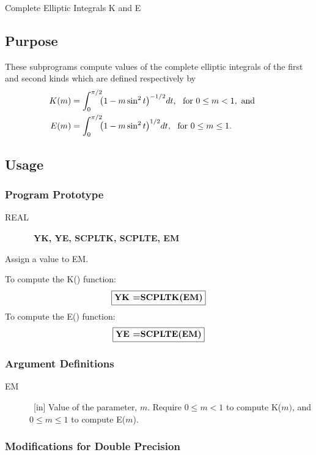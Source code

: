 \documentclass[twoside]{MATH77}
\begin{document}
 Complete Elliptic Integrals K and E


\subsection{Purpose}

These subprograms compute values of the complete elliptic integrals of the
first and second kinds which are defined respectively by%
\begin{align*}
\hspace{-15pt}K(m)&=\int_0^{\pi /2}\!\!\!\left( 1-m\sin ^2t\right)^{-1/2}
\!dt,\ \ \text{for }0\leq m<1,\text{ and}\\
\hspace{-15pt}E(m)&=\int_0^{\pi /2}\!\!\!\left( 1-m\sin ^2t\right)^{1/2}
\!dt,\ \ \text{for }0\leq m\leq 1.
\end{align*}
\subsection{Usage}

\subsubsection{Program Prototype}

\begin{description}
\item[REAL]  \ {\bf YK, YE, SCPLTK, SCPLTE, EM}
\end{description}

Assign a value to EM.

To compute the K() function:
$$
\fbox{{\bf YK =SCPLTK(EM)}}
$$
To compute the E() function:
$$
\fbox{{\bf YE =SCPLTE(EM)}}
$$

\subsubsection{Argument Definitions}

\begin{description}
\item[EM]  \ [in] Value of the parameter, $m$. Require $0\leq m<1$ to
compute K($m)$, and $0\leq m\leq 1$ to compute E($m$).
\end{description}

\subsubsection{Modifications for Double Precision}
\end{document}
